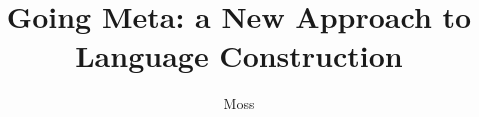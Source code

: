 \documentclass[defaultstyle,12pt]{thesis}
\title{Going Meta: a New Approach to Language Construction}
\author{Moss}{Prescott}
\begin{document}











\nocite{*}		%




\end{document}
